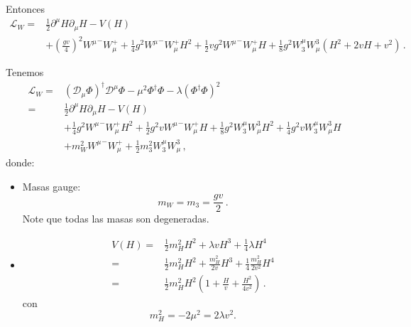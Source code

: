 Entonces
\begin{align}
  \label{eq:96qftm}
  \mathcal{L}_{W}=&\frac{1}{2}\partial^\mu H\partial_\mu H-V(H)\nonumber\\
  &+\left(\frac{gv}{4}\right)^2{W^\mu}^-W_\mu^++\frac{1}{4}g^2{W^\mu}^-W_\mu^+H^2+\frac{1}{2}vg^2{W^\mu}^-W_\mu^+H+\frac{1}{8}g^2 W_3^\mu W^3_\mu\left(H^2+2vH+v^2\right)\,.
\end{align}
\begin{frame}
Tenemos
\begin{align}
  \label{eq:lwbhfinm}
  \mathcal{L}_{W}=&\left( \mathcal{D}_\mu{\Phi} \right)^{\dagger}\mathcal{D}^\mu\Phi-\mu^2\Phi^{\dagger}\Phi-\lambda \left( \Phi^{\dagger}\Phi \right)^2 \nonumber\\
  =&\frac{1}{2}\partial^\mu H\partial_\mu H-V(H)\nonumber\\
&+\frac{1}{4}g^2{W^\mu}^-W_\mu^+H^2+\frac{1}{2}g^2v{W^\mu}^-W_\mu^+H
  +\frac{1}{8}g^2 W_3^\mu W^3_\mu H^2+\frac{1}{4}g^2v W_3^\mu W^3_\mu H\nonumber\\
  &+m_W^2{W^\mu}^-W_\mu^+ +\frac{1}{2}m_3^2W_3^\mu W^3_\mu\,,
\end{align}
donde:
\begin{itemize} %
\item Masas gauge:
\begin{equation}
  m_W=m_3=\frac{gv}{2}\,.
\end{equation}
Note que todas las masas son degeneradas.
\item
  \begin{align}
    V(H)=&\tfrac{1}{2}m_H^2H^2+\lambda vH^3+\tfrac{1}{4}\lambda H^4\nonumber\\
    =&\frac{1}{2}m_H^2H^2+\frac{m_H^2}{2v}H^3+\frac{1}{4}\frac{m_H^2}{2v^2} H^4\nonumber\\
    =&\frac{1}{2}m_H^2H^2\left(1+\frac{H}{v}+\frac{H^2}{4v^2}\right)\,.
  \end{align}
con
\begin{equation}
  m_H^2=-2\mu^2=2\lambda v^2.
\end{equation}
\end{itemize} %
\end{frame}


